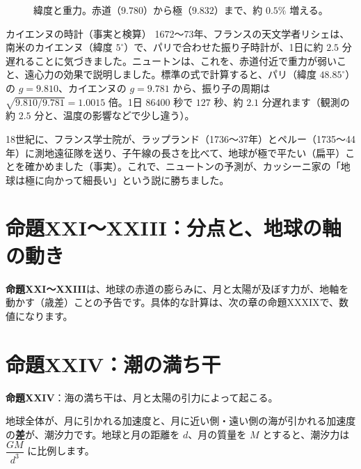 \documentclass[a4paper,11pt,openany]{ltjsbook}
\begin{document}
\begin{figure}[htbp]
\centering
{}
\caption{緯度と重力。赤道（$9.780$）から極（$9.832$）まで、約 $0.5\%$ 増える。}
\end{figure}

\begin{examplebox}{カイエンヌの時計（事実と検算）}
1672〜73年、フランスの天文学者リシェは、南米のカイエンヌ（緯度 $5^\circ$）で、パリで合わせた振り子時計が、1日に約 $2.5$ 分遅れることに気づきました。ニュートンは、これを、赤道付近で重力が弱いこと、遠心力の効果で説明しました。標準の式で計算すると、パリ（緯度 $48.85^\circ$）の $g=9.810$、カイエンヌの $g=9.781$ から、振り子の周期は $\sqrt{9.810/9.781}=1.0015$ 倍。1日 $86400$ 秒で $127$ 秒、約 $2.1$ 分遅れます（観測の約 $2.5$ 分と、温度の影響などで少し違う）。
\end{examplebox}

18世紀に、フランス学士院が、ラップランド（1736〜37年）とペルー（1735〜44年）に測地遠征隊を送り、子午線の長さを比べて、地球が極で平たい（扁平）ことを確かめました（事実）。これで、ニュートンの予測が、カッシーニ家の「地球は極に向かって細長い」という説に勝ちました。

\section{命題XXI〜XXIII：分点と、地球の軸の動き}

\textbf{命題XXI〜XXIII}は、地球の赤道の膨らみに、月と太陽が及ぼす力が、地軸を動かす（歳差）ことの予告です。具体的な計算は、次の章の命題XXXIXで、数値になります。

\section{命題XXIV：潮の満ち干}

\textbf{命題XXIV}：海の満ち干は、月と太陽の引力によって起こる。

地球全体が、月に引かれる加速度と、月に近い側・遠い側の海が引かれる加速度の\textbf{差}が、潮汐力です。地球と月の距離を $d$、月の質量を $M$ とすると、潮汐力は $\dfrac{GM}{d^3}$ に比例します。
\end{document}
